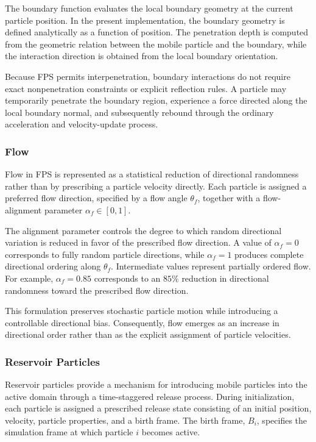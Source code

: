The boundary function evaluates the local boundary
geometry at the current particle position. In the
present implementation, the boundary geometry is
defined analytically as a function of position. The
penetration depth is computed from the geometric
relation between the mobile particle and the boundary,
while the interaction direction is obtained from the
local boundary orientation.

Because FPS permits interpenetration, boundary
interactions do not require exact nonpenetration
constraints or explicit reflection rules. A particle may
temporarily penetrate the boundary region, experience a
force directed along the local boundary normal, and
subsequently rebound through the ordinary acceleration
and velocity-update process.

\subsubsection{Flow}

Flow in FPS is represented as a statistical reduction of
directional randomness rather than by prescribing a
particle velocity directly. Each particle is assigned a
preferred flow direction, specified by a flow angle
$\theta_f$, together with a flow-alignment parameter
$\alpha_f \in [0,1]$.

The alignment parameter controls the degree to which
random directional variation is reduced in favor of the
prescribed flow direction. A value of
$\alpha_f=0$ corresponds to fully random particle
directions, while $\alpha_f=1$ produces complete
directional ordering along $\theta_f$. Intermediate
values represent partially ordered flow. For example,
$\alpha_f=0.85$ corresponds to an $85\%$ reduction in
directional randomness toward the prescribed flow
direction.

This formulation preserves stochastic particle motion
while introducing a controllable directional bias.
Consequently, flow emerges as an increase in directional
order rather than as the explicit assignment of particle
velocities.

\subsubsection{Reservoir Particles}

Reservoir particles provide a mechanism for introducing
mobile particles into the active domain through a
time-staggered release process. During initialization,
each particle is assigned a prescribed release state
consisting of an initial position, velocity, particle
properties, and a birth frame. The birth frame,
$B_i$, specifies the simulation frame at which
particle $i$ becomes active.

